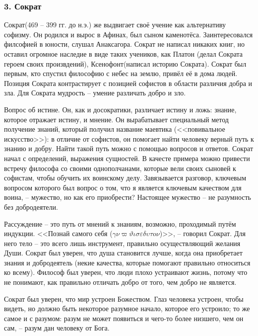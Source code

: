 \documentclass[a4paper, 12pt]{book} %
\begin{document}
\subsubsection*{3. Сократ}

Сократ(469 -- 399 гг. до н.э.) же выдвигает своё учение как альтернативу софизму. Он родился и вырос в Афинах, был сыном каменотёса. Заинтересовался филсофией в юности, слушал Анаксагора. Сократ не написал никаких книг, но оставил огромное наследие в виде таких учеников, как Платон (делал Сократа героем своих произвдений), Ксенофонт(написал историю Сократа). Сократ был первым, кто спустил философию с небес на землю, привёл её в дома людей. Позиция Сократа контрастирует с позицией софистов в области различия добра и зла. Для Сократа мудрость -- умение различать добро и зло. 

Вопрос об истине. Он, как и досократики, различает истину и ложь: знание, которое отражает истину, и мнение. Он вырабатывает специальный метод получение знаний, который получил название маевтика (<<повивальное искусство>>): в отличие от софистов, он помогает найти человеку верный путь к знанию и добру. Найти такой путь можно с помощью вопросов и ответов. Сократ начал с определений, выражения сущностей. В качесте примера можно привести встречу философа со своими однополчанами, которые вели своих сыновей к софистам, чтобы обучить их воинскому делу. Завязывается разговор, ключевым вопросом которого был вопрос о том, что я является ключевым качеством для воина, -- мужество, но как его приобрести? Настоящее мужество -- не разумность без добродеятели.

Рассуждение -- это путь от мнений к знаниям, возможно, проходимый путём индукции. <<Познай самого себя ($\gamma \nu \varpi \vartheta \iota \sigma \varepsilon \delta \upsilon \tau o \nu$)>>, -- говорил Сократ. Для него тело -- это всего лишь инструмент, правильно осуществляющий желания Души. Сократ был уверен, что душа становится лучше, когда она приобретает знания и добродеятель (некие качества, которые помогают правильно относиться ко всему). Философ был уверен, что люди плохо устраивают жизнь, потому что не понимают, как правильно отличать добро от того, чем добро не является.

Сократ был уверен, что мир устроен Божеством. Глаз человека устроен, чтобы видеть, но должно быть некоторое разумное начало, которое его устроило; то же самое и с разумом: разум не может появиться и чего-то более низшего, чем он сам, -- разум дан человеку от Бога.
\end{document}
